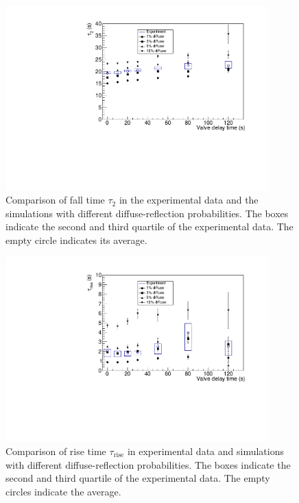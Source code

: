 \begin{figure}[h!]
  \centering \includegraphics[width=0.9\textwidth]{falltime.pdf}
  \caption{Comparison of fall time $\tau_2$ in the experimental data
    and the simulations with different diffuse-reflection
    probabilities. The boxes indicate the second and third quartile of
    the experimental data. The empty circle indicates its average.}
\label{fig:falltime}
\end{figure}
\begin{figure}[h!]
\centering
\includegraphics[width=0.9\textwidth]{risetime.pdf}
\caption{Comparison of rise time $\tau_{\mathrm{rise}}$ in
  experimental data and simulations with different diffuse-reflection
  probabilities. The boxes indicate the second and third quartile of
  the experimental data. The empty circles indicate the average.}
\label{fig:risetime}
\end{figure}



